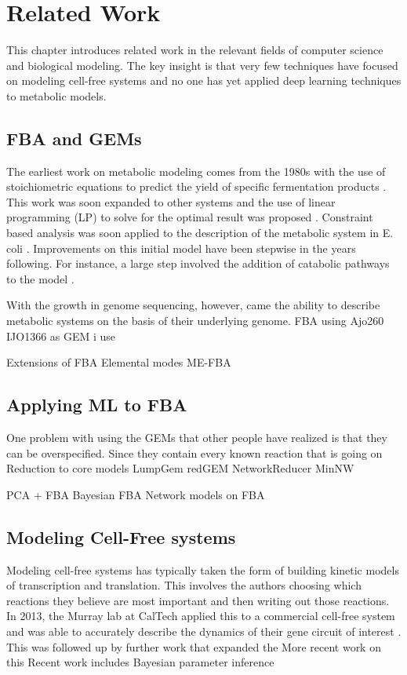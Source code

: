 \chapter{Related Work} \label{chap:rw}
This chapter introduces related work in the relevant fields of computer science and biological modeling.
The key insight is that very few techniques have focused on modeling cell-free systems and no one has yet applied deep learning techniques to metabolic models.

\section{FBA and GEMs}
The earliest work on metabolic modeling comes from the 1980s with the use of stoichiometric equations to predict the yield of specific fermentation products \cite{papoutsakis1984equations}.
This work was soon expanded to other systems and the use of linear programming (LP) to solve for the optimal result was proposed \cite{fell1986fat}.
Constraint based analysis was soon applied to the description of the metabolic system in E. coli \cite{majewski1990simple}.
Improvements on this initial model have been stepwise in the years following.
For instance, a large step involved the addition of catabolic pathways to the model \cite{varma1993metabolic}.

With the growth in genome sequencing, however, came the ability to describe metabolic systems on the basis of their underlying genome.
FBA using Ajo260
IJO1366 as GEM i use

Extensions of FBA
Elemental modes
ME-FBA

\section{Applying ML to FBA}
One problem with using the GEMs that other people have realized is that they can be overspecified.
Since they contain every known reaction that is going on
Reduction to core models
	LumpGem
	redGEM
	NetworkReducer
	MinNW

PCA + FBA
Bayesian FBA
Network models on FBA

\section{Modeling Cell-Free systems}\label{rw:mod-cf}
Modeling cell-free systems has typically taken the form of building kinetic models of transcription and translation.
This involves the authors choosing which reactions they believe are most important and then writing out those reactions.
In 2013, the Murray lab at CalTech applied this to a commercial cell-free system and was able to accurately describe the dynamics of their gene circuit of interest \cite{tuza2013silico}.
This was followed up by further work that expanded the \cite{wayman2015dynamic}
More recent work on this Recent work includes Bayesian parameter inference \cite{moore2018rapid}


